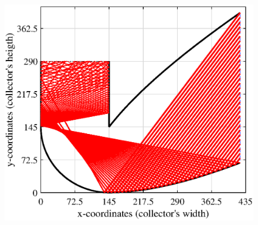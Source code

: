 \begin{figure}[ht!]
	\begin{minipage}{0.48\columnwidth}
		\includegraphics[scale=0.48]{figs/RT2D-hts145.eps}
		

\end{minipage}
\end{figure}
